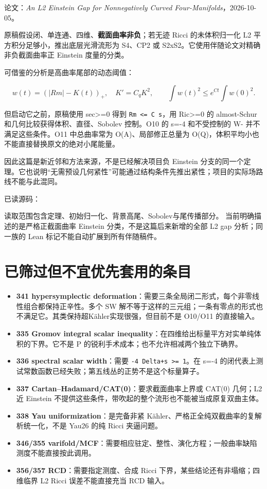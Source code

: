 \documentclass[UTF8,11pt,fontset=none]{ctexart}
\providecommand{\tightlist}{\setlength{\itemsep}{1pt}\setlength{\parskip}{0pt}}
\begin{document}
论文：\emph{An L2 Einstein Gap for Nonnegatively Curved Four-Manifolds}，2026-10-05。\cite{OAI348}

原稿假设闭、单连通、四维、\textbf{截面曲率非负}；若无迹 Ricci 的未体积归一化 L2 平方积分足够小，推出底层光滑流形为 S4、CP2 或 S2xS2。它使用伴随论文对精确非负截面曲率正 Einstein 度量的分类。

可借鉴的分析是高曲率尾部的动态阈值：

\[
w(t)=(|Rm|-K(t))_+,\quad K'=C_qK^2,
\qquad \int w(t)^2\le e^{Ct}\int w(0)^2.
\]

但启动它之前，原稿使用 sec\textgreater=0 得到 \texttt{\textbar{}Rm\textbar{}\ \textless{}=\ C\ s}，用 Ric\textgreater=0 的 almost-Schur 和几何比较获得体积、直径、Sobolev 控制。O10 的 s=-4 和不受控制的 W- 并不满足这些条件。O11 中总曲率常为 O(A)、局部修正总量为 O(Q)，体积平均小也不能直接替换原文的绝对小尾能量。

因此这篇是新近邻和方法来源，不是已经解决项目负 Einstein 分支的同一个定理。它也说明``无需预设几何紧性''可能通过结构条件先推出紧性；项目的实际场路线不能与此混同。

已读源码： 

读取范围包含定理、初始归一化、背景高尾、Sobolev与尾传播部分。 当前明确描述的是严格正截面曲率 Einstein 分类，不是这篇后来新增的全部 L2 gap 分析；同一族的 Lean 标记不能自动扩展到所有伴随稿件。

\section{已筛过但不宜优先套用的条目}\label{ch6:ux5df2ux7b5bux8fc7ux4f46ux4e0dux5b9cux4f18ux5148ux5957ux7528ux7684ux6761ux76ee}

\begin{itemize}
\tightlist
\item
  \textbf{341 hypersymplectic deformation}：需要三条全局闭二形式，每个非零线性组合都保持正辛性。多个 SW 解不等于这样的三元组；一条有零点的形式也不满足它。其类保持超Kähler实现很强，但目前不是 O10/O11 的直接输入。
\item
  \textbf{335 Gromov integral scalar inequality}：在四维给出标量平方对实单纯体积的下界。它不是 P 的锐利手术成本；也不允许相减两个独立下确界。
\item
  \textbf{336 spectral scalar width}：需要 \texttt{-4\ Delta+s\ \textgreater{}=\ 1}。在 s=-4 的闭代表上测试常数函数已经失败；第五线丛的正势不是这个标量算子。
\item
  \textbf{337 Cartan--Hadamard/CAT(0)}：要求截面曲率上界或 CAT(0) 几何；L2 近 Einstein 不提供这些条件，带吹起的整个流形也不能被当成原复双曲主体。
\item
  \textbf{338 Yau uniformization}：是完备非紧 Kähler、严格正全纯双截曲率的复解析统一化，不是 Yau26 的纯 Ricci 夹逼问题。
\item
  \textbf{346/355 varifold/MCF}：需要相应驻定、整性、演化方程；一般曲率缺陷测度不能直接按此调用。
\item
  \textbf{356/357 RCD}：需要指定测度、合成 Ricci 下界，某些结论还有非塌缩；四维临界 L2 Ricci 误差不能直接充当 RCD 输入。
\end{itemize}
\end{document}

